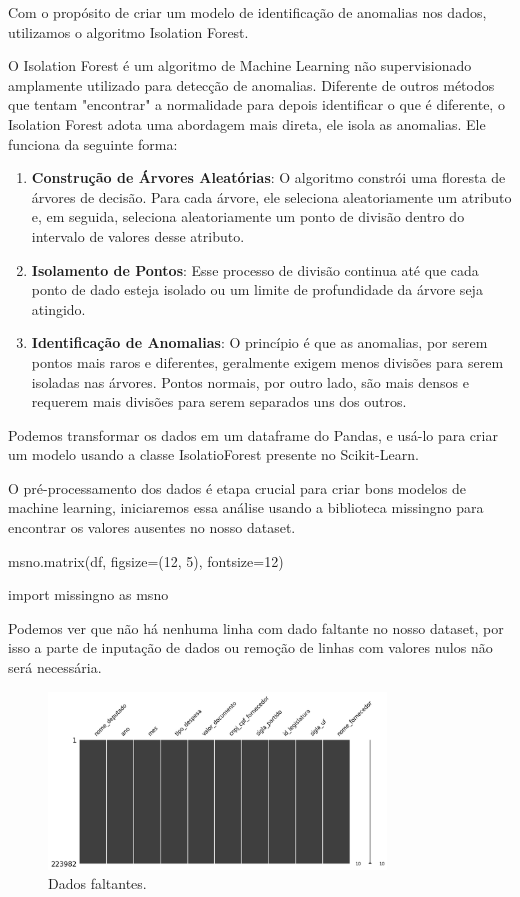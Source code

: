 \documentclass[12pt, a4paper]{article}
\begin{document}
Com o propósito de criar um modelo de identificação de anomalias nos dados, utilizamos o algoritmo Isolation Forest\cite{Scikit-Learn}.

O Isolation Forest é um algoritmo de Machine Learning não supervisionado amplamente utilizado para detecção de anomalias. Diferente de outros métodos que tentam "encontrar" a normalidade para depois identificar o que é diferente, o Isolation Forest adota uma abordagem mais direta, ele isola as anomalias. Ele funciona da seguinte forma\cite{isolation-forest}:

\begin{enumerate}
	\item \textbf{Construção de Árvores Aleatórias}: O algoritmo constrói uma floresta de árvores de decisão. Para cada árvore, ele seleciona aleatoriamente um atributo e, em seguida, seleciona aleatoriamente um ponto de divisão dentro do intervalo de valores desse atributo.
	\item \textbf{Isolamento de Pontos}: Esse processo de divisão continua até que cada ponto de dado esteja isolado ou um limite de profundidade da árvore seja atingido.
	\item \textbf{Identificação de Anomalias}: O princípio é que as anomalias, por serem pontos mais raros e diferentes, geralmente exigem menos divisões para serem isoladas nas árvores. Pontos normais, por outro lado, são mais densos e requerem mais divisões para serem separados uns dos outros.
\end{enumerate}

Podemos transformar os dados em um dataframe do Pandas\cite{Pandas}, e usá-lo para criar um modelo usando a classe IsolatioForest presente no Scikit-Learn\cite{Scikit-Learn}.

O pré-processamento dos dados é etapa crucial para criar bons modelos de machine learning, iniciaremos essa análise usando a biblioteca missingno para encontrar os valores ausentes no nosso dataset.

\begin{python}
msno.matrix(df, figsize=(12, 5), fontsize=12)

import missingno as msno
\end{python}

Podemos ver que não há nenhuma linha com dado faltante no nosso dataset, por isso a parte de inputação de dados ou remoção de linhas com valores nulos não será necessária.

\begin{figure}[!htbp]
	\centering
	\includegraphics[width=0.8\textwidth]{assets/3_plot1.png}
	\caption{Dados faltantes.}
	\label{fig:dados faltantes}
\end{figure}
\end{document}
